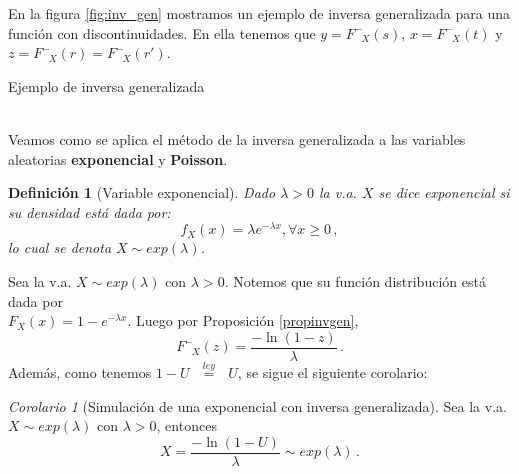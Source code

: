 \documentclass[letterpaper,11pt]{article} %
\theoremstyle{defbreak}
\newtheorem{definition}{Definición}[subsection]
\theoremstyle{propbreak}
\theoremstyle{remark}
\theoremstyle{break}
\newtheorem{corolary}{Corolario}[subsection]
\def\Finvgen{F^-_{\mbox{ }X}}
\def\igualley{\mbox{ }\overset{ley}{=}\mbox{ }}
\begin{document}
En la figura \ref{fig:inv_gen} mostramos un ejemplo de inversa generalizada para una función con discontinuidades. En ella tenemos que $y=\Finvgen(s), \, x = \Finvgen(t)$ y $z=\Finvgen(r)=\Finvgen(r')$.
\begin{images}[\label{fig:inv_gen}]{Ejemplo de inversa generalizada}
	\imagesnewline
\end{images}

\vspace{1.5cm}\\
Veamos como se aplica el método de la inversa generalizada a las variables aleatorias \textbf{exponencial} y \textbf{Poisson}.

\begin{definition}[Variable exponencial]
Dado $\lambda>0$ la v.a. $X$ se dice exponencial si su densidad está dada por:
$$ f_X(x) = \lambda e^{-\lambda x}, \forall x\geq 0 \, ,$$
lo cual se denota $X\sim exp(\lambda)$.
\end{definition}

Sea la v.a. $X\sim exp(\lambda)$ con $\lambda>0$. Notemos que su función distribución está dada por \\ $F_X(x)=1-e^{-\lambda x}$. Luego por Proposición \ref{propinvgen},
$$\Finvgen(z)=\displaystyle\frac{-\ln(1-z)}{\lambda} \, .$$
Además, como tenemos $1-U\igualley U$, se sigue el siguiente corolario:
\begin{corolary}[Simulación de una exponencial con inversa generalizada]
\label{simexp}  %
Sea la v.a. $X\sim exp(\lambda)$ con $\lambda>0$, entonces
$$X=\displaystyle\frac{-\ln(1-U)}{\lambda}\sim exp(\lambda) \, .$$
\end{corolary}
\end{document}
